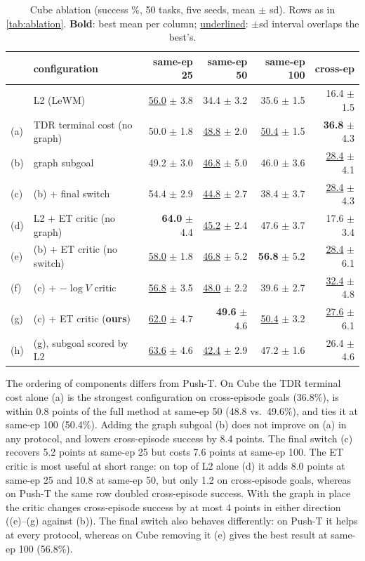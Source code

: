 \documentclass{article} %
\begin{document}
\begin{table}[h]
\centering\small
\caption{Cube ablation (success \%, 50 tasks, five seeds, mean $\pm$ sd). Rows as in
\cref{tab:ablation}. \textbf{Bold}: best mean per column; \underline{underlined}: $\pm$sd
interval overlaps the best's.}
\label{tab:ablation-cube}
\begin{tabular}{llrrrr}
\toprule
& configuration & same-ep 25 & same-ep 50 & same-ep 100 & cross-ep \\
\midrule
& L2 (LeWM) & \underline{56.0} $\pm$ 3.8 & 34.4 $\pm$ 3.2 & 35.6 $\pm$ 1.5 & 16.4 $\pm$ 1.5 \\
(a) & TDR terminal cost (no graph) & 50.0 $\pm$ 1.8 & \underline{48.8} $\pm$ 2.0 & \underline{50.4} $\pm$ 1.5 & \textbf{36.8} $\pm$ 4.3 \\
(b) & graph subgoal & 49.2 $\pm$ 3.0 & \underline{46.8} $\pm$ 5.0 & 46.0 $\pm$ 3.6 & \underline{28.4} $\pm$ 4.1 \\
(c) & (b) + final switch & 54.4 $\pm$ 2.9 & \underline{44.8} $\pm$ 2.7 & 38.4 $\pm$ 3.7 & \underline{28.4} $\pm$ 4.3 \\
\midrule
(d) & L2 + ET critic (no graph) & \textbf{64.0} $\pm$ 4.4 & \underline{45.2} $\pm$ 2.4 & 47.6 $\pm$ 3.7 & 17.6 $\pm$ 3.4 \\
(e) & (b) + ET critic (no switch) & \underline{58.0} $\pm$ 1.8 & \underline{46.8} $\pm$ 5.2 & \textbf{56.8} $\pm$ 5.2 & \underline{28.4} $\pm$ 6.1 \\
(f) & (c) + $-\log V$ critic & \underline{56.8} $\pm$ 3.5 & \underline{48.0} $\pm$ 2.2 & 39.6 $\pm$ 2.7 & \underline{32.4} $\pm$ 4.8 \\
(g) & (c) + ET critic (\textbf{ours}) & \underline{62.0} $\pm$ 4.7 & \textbf{49.6} $\pm$ 4.6 & \underline{50.4} $\pm$ 3.2 & \underline{27.6} $\pm$ 6.1 \\
(h) & (g), subgoal scored by L2 & \underline{63.6} $\pm$ 4.6 & \underline{42.4} $\pm$ 2.9 & 47.2 $\pm$ 1.6 & 26.4 $\pm$ 4.6 \\
\bottomrule
\end{tabular}
\end{table}

The ordering of components differs from Push-T. On Cube the TDR terminal cost alone (a) is the
strongest configuration on cross-episode goals (36.8\%), is within 0.8 points of the full method
at same-ep 50 (48.8 vs.\ 49.6\%), and ties it at same-ep 100 (50.4\%). Adding the graph subgoal (b) does not improve on (a) in any
protocol, and lowers cross-episode success by 8.4 points. The final switch (c) recovers 5.2 points
at same-ep 25 but costs 7.6 points at same-ep 100. The ET critic is most useful at short range:
on top of L2 alone (d) it adds 8.0 points at same-ep 25 and 10.8 at same-ep 50, but only 1.2 on
cross-episode goals, whereas on Push-T the same row doubled cross-episode success. With the
graph in place the critic changes cross-episode success by at most 4 points in either
direction ((e)--(g) against (b)). The final switch also behaves differently: on Push-T it helps at every protocol, whereas on
Cube removing it (e) gives the best result at same-ep 100 (56.8\%).
\end{document}
